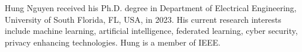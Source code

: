 \documentclass[journal]{IEEEtai}
\begin{document}




\begin{IEEEbiography}{Hung Nguyen}
	received his Ph.D. degree in Department of Electrical Engineering, University of South Florida, FL, USA, in 2023. His current research interests include machine learning, artificial intelligence, federated learning, cyber security, privacy enhancing technologies. Hung is a member of IEEE.
\end{IEEEbiography}
\end{document}
